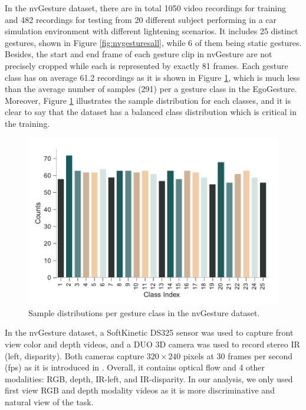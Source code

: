 In the nvGesture dataset, there are in total 1050 video recordings for training and 482 recordings for testing from 20 different subject performing in a car simulation environment with different lightening scenarios. It includes 25 distinct gestures, shown in Figure \ref{fig:nvgesturesall}, while 6 of them being static gestures. Besides, the start and end frame of each gesture clip in nvGesture are not precisely cropped while each is represented by exactly 81 frames. Each gesture class has on average 61.2 recordings as it is shown in Figure \ref{fig:nvidiaclassdist}, which is much less than the average number of samples (291) per a gesture class in the EgoGesture. Moreover, Figure \ref{fig:nvidiaclassdist} illustrates the sample distribution for each classes, and it is clear to say that the dataset has a balanced class distribution which is critical in the training. \\
\begin{figure}[h!]
	\centering
	\includegraphics[width=0.5\linewidth]{figures/nvidiaclassdist}
	\caption{Sample distributions per gesture class in the nvGesture dataset.}
	\label{fig:nvidiaclassdist}
\end{figure}

In the nvGesture dataset, a SoftKinetic DS325 sensor was used to capture front view color and depth videos, and a DUO 3D camera was used to record stereo IR (left, disparity). Both cameras capture $320\times240$ pixels at 30 frames per second (fps) as it is introduced in \cite{molchanov_online_2016}. Overall, it contains optical flow and 4 other modalities: RGB, depth, IR-left, and IR-disparity. In our analysis,  we only used first view  RGB and depth modality videos  as it is more discriminative and natural view of the task. \\  

